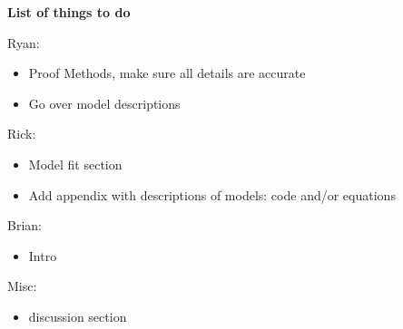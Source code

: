 \textbf{List of things to do}

Ryan:
\begin{itemize}
\item Proof Methods, make sure all details are accurate
\item Go over model descriptions
\end{itemize}
Rick:
\begin{itemize}
\item Model fit section
\item Add appendix with descriptions of models: code and/or equations
\end{itemize}

Brian:
\begin{itemize}
\item Intro
\end{itemize}

Misc:
\begin{itemize}
\item discussion section
\end{itemize}
